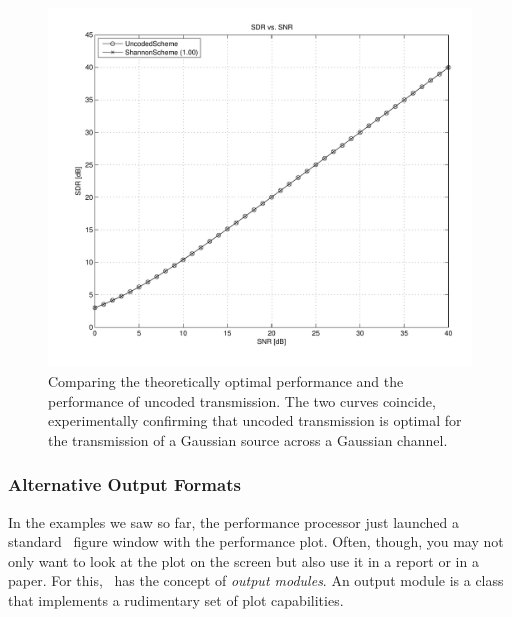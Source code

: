 \begin{figure}
  \begin{center}
    \includegraphics[width=\textwidth]{figures/matlab/ex_shannonscheme.pdf}
  \end{center}
  \caption{Comparing the theoretically optimal performance and the performance
  of uncoded transmission. The two curves coincide, experimentally confirming
  that uncoded transmission is optimal for the transmission of a Gaussian source
  across a Gaussian channel.}
  \label{fig:shannonscheme}
\end{figure}


\subsubsection{Alternative Output Formats}

In the examples we saw so far, the performance processor just launched a
standard \matlab\ figure window with the performance plot. Often, though, you
may not only want to look at the plot on the screen but also use it in a report
or in a paper. For this, \jscsim\ has the concept of \emph{output modules}. An
output module is a class that implements a rudimentary set of plot capabilities.

